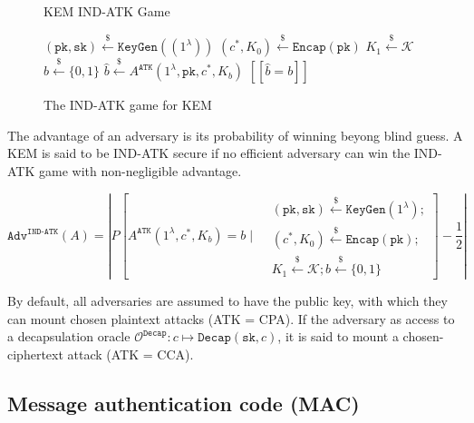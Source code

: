 \documentclass[runningheads]{llncs}
\newcommand{\keygen}{\texttt{KeyGen}}
\newcommand{\encap}{\texttt{Encap}}
\newcommand{\decap}{\texttt{Decap}}
\newcommand{\pk}{\texttt{pk}}
\newcommand{\sk}{\texttt{sk}}
\newcommand{\leftsample}{\stackrel{\$}{\leftarrow}}
\newcommand{\llbrack}{[\![}
\newcommand{\rrbrack}{]\!]}
\begin{document}
\begin{figure}[h]
    \centering
    \begin{minipage}[t]{0.5\textwidth}
        \begin{algorithm}[H]
            \caption*{KEM IND-ATK Game}
            \begin{algorithmic}[1]
                \State $(\pk, \sk) \leftsample \keygen((1^\lambda))$
                \State $(c^\ast, K_0) \leftsample \encap(\pk)$
                \State $K_1 \leftsample \mathcal{K}$
                \State $b \leftsample \{0,1\}$
                \State $\hat{b} \leftsample A^\texttt{ATK}(1^\lambda, \pk, c^\ast, K_b)$
                \State \Return $\llbrack \hat{b} = b \rrbrack$
            \end{algorithmic}
        \end{algorithm}
    \end{minipage}
    \caption{The IND-ATK game for KEM}\label{fig:kem-ind-atk-game}
\end{figure}

The advantage of an adversary is its probability of winning beyong blind guess. A KEM is said to be IND-ATK secure if no efficient adversary can win the IND-ATK game with non-negligible advantage.

$$
\texttt{Adv}^\texttt{IND-ATK}(A) = \left\vert P\left[
    A^\texttt{ATK}(1^\lambda, c^\ast, K_b) = b
    \mid \begin{aligned}
    &(\pk, \sk) \leftsample \keygen(1^\lambda); \\
    &(c^\ast, K_0) \leftsample \encap(\pk); \\
    &K_1 \leftsample \mathcal{K}; b \leftsample \{0,1\}
    \end{aligned}
\right] - \frac{1}{2}
\right\vert
$$

By default, all adversaries are assumed to have the public key, with which they can mount chosen plaintext attacks (ATK = CPA). If the adversary as access to a decapsulation oracle $\mathcal{O}^\decap: c \mapsto \decap(\sk, c)$, it is said to mount a chosen-ciphertext attack (ATK = CCA).

\subsection{Message authentication code (MAC)}\label{sec:message-authentication-code}
\end{document}
